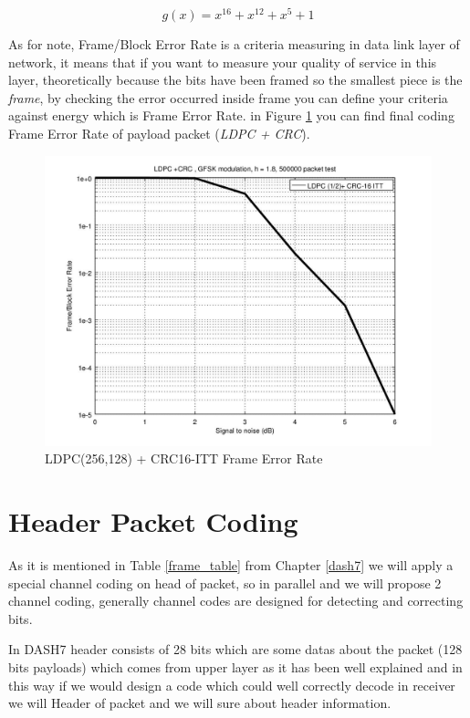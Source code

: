  \begin{equation}\label{crc}
g(x) = x^{16}+x^{12}+x^{5}+1
\end{equation}

As for note, Frame/Block Error Rate is a criteria measuring in data link layer of network, it means that if you want to measure your quality of service in this layer, theoretically because the bits have been framed   
 so the smallest piece is the \textit{frame}, by checking the error occurred inside frame you can define your criteria against energy which is Frame Error Rate. in Figure \ref{LDPC_crc} you can find final coding Frame Error Rate of payload packet (\textit{LDPC + CRC}). 
 
 \begin{figure}[htbp]
\centering
\includegraphics[scale=0.6]{Figures/ldpc_crc.jpg}
\caption[LDPC(256,128) + CRC16-ITT]{LDPC(256,128) + CRC16-ITT Frame Error Rate}
\label{LDPC_crc}
\end{figure}

 
%
\section{Header Packet Coding}
As it is mentioned in Table \ref{frame_table} from Chapter \ref{dash7} we will apply a special channel coding on head of packet, so in parallel and we will propose 2 channel coding, generally channel codes are designed for detecting and correcting bits.

In DASH7 header consists of 28 bits which are some datas about the packet (128 bits payloads) which comes from upper layer as it has been well explained and in this way if we would design a code which could well correctly decode in receiver we will Header of packet and we will sure about header information.


